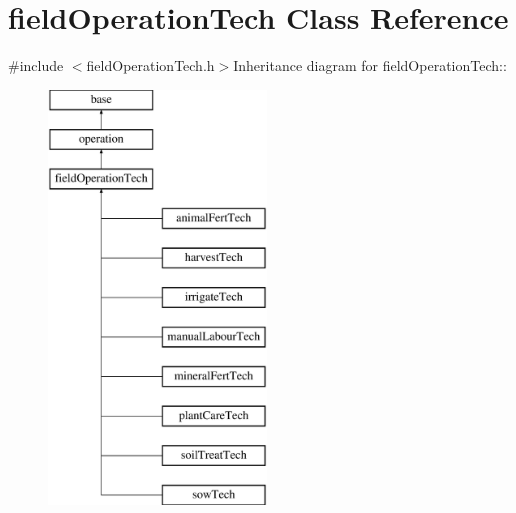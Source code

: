 \hypertarget{classfield_operation_tech}{
\section{fieldOperationTech Class Reference}
\label{classfield_operation_tech}
}


{\ttfamily \#include $<$fieldOperationTech.h$>$}Inheritance diagram for fieldOperationTech::\begin{figure}[H]
\begin{center}
\leavevmode
\includegraphics[height=11cm]{classfield_operation_tech}
\end{center}
\end{figure}
